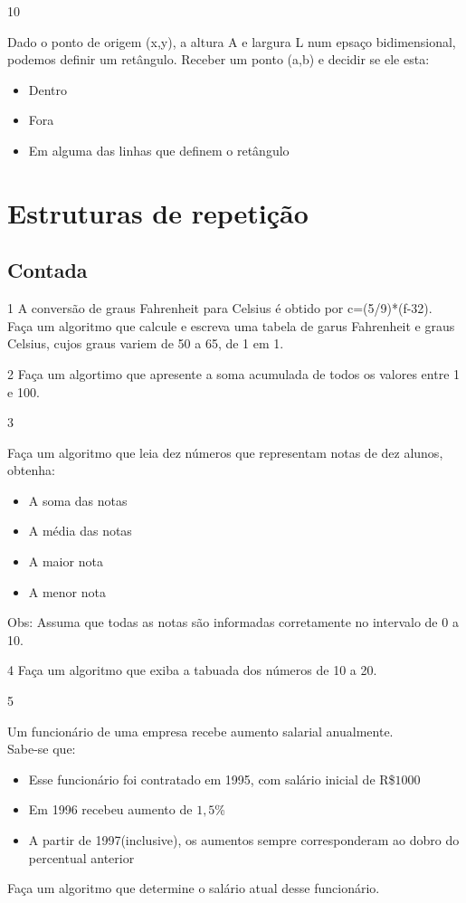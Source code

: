 \begin{exercicio}
  {10}
  {Dado o ponto de origem (x,y), a altura A e largura L num epsaço bidimensional, podemos definir um retângulo. Receber um ponto (a,b) e decidir se ele esta:
  \begin{itemize}
    \item Dentro
    \item Fora 
    \item Em alguma das linhas que definem o retângulo
  \end{itemize}}
\end{exercicio}

\section{Estruturas de repetição}
\subsection{Contada}
\begin{exercicio}
  {1}
  {A conversão de graus Fahrenheit para Celsius é obtido por c=(5/9)*(f-32). \\
  Faça um algoritmo que calcule e escreva uma tabela de garus Fahrenheit e graus Celsius, cujos graus variem de 50 a 65, de 1 em 1.}
\end{exercicio}
\begin{exercicio}
  {2}
  {Faça um algortimo que apresente a soma acumulada de todos os valores entre 1 e 100.}
\end{exercicio}
\begin{exercicio}
  {3}
  {Faça um algoritmo que leia dez números que representam notas de dez alunos, obtenha:
  \begin{itemize}
    \item A soma das notas
    \item A média das notas
    \item A maior nota
    \item A menor nota
  \end{itemize}}
  Obs: Assuma que todas as notas são informadas corretamente no intervalo de 0 a 10.
\end{exercicio}
\begin{exercicio}
  {4}
  {Faça um algoritmo que exiba a tabuada dos números de 10 a 20.}
\end{exercicio}
\begin{exercicio}
  {5}
  {Um funcionário de uma empresa recebe aumento salarial anualmente. \\
  Sabe-se que:
  \begin{itemize}
    \item Esse funcionário foi contratado em 1995, com salário inicial de R\$$1000$
    \item Em 1996 recebeu aumento de $1,5$\%
    \item A partir de 1997(inclusive), os aumentos sempre corresponderam ao dobro do percentual anterior
  \end{itemize}
  Faça um algoritmo que determine o salário atual desse funcionário.}
\end{exercicio}
